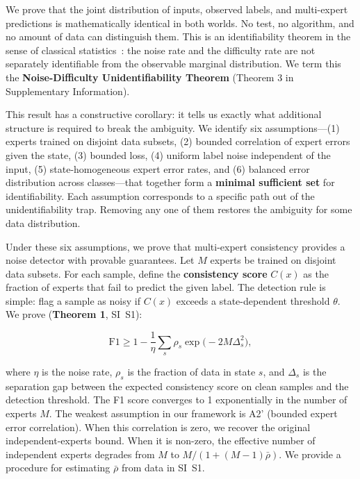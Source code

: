 \documentclass[12pt,a4paper]{article}
\begin{document}
We prove that the joint distribution of inputs, observed labels, and multi-expert predictions is mathematically identical in both worlds. No test, no algorithm, and no amount of data can distinguish them. This is an identifiability theorem in the sense of classical statistics~\cite{placeholder}: the noise rate and the difficulty rate are not separately identifiable from the observable marginal distribution. We term this the \textbf{Noise-Difficulty Unidentifiability Theorem} (Theorem 3 in Supplementary Information).

This result has a constructive corollary: it tells us exactly what additional structure is required to break the ambiguity. We identify six assumptions---(1) experts trained on disjoint data subsets, (2) bounded correlation of expert errors given the state, (3) bounded loss, (4) uniform label noise independent of the input, (5) state-homogeneous expert error rates, and (6) balanced error distribution across classes---that together form a \textbf{minimal sufficient set} for identifiability. Each assumption corresponds to a specific path out of the unidentifiability trap. Removing any one of them restores the ambiguity for some data distribution.

Under these six assumptions, we prove that multi-expert consistency provides a noise detector with provable guarantees. Let $M$ experts be trained on disjoint data subsets. For each sample, define the \textbf{consistency score} $C(x)$ as the fraction of experts that fail to predict the given label. The detection rule is simple: flag a sample as noisy if $C(x)$ exceeds a state-dependent threshold $\theta$. We prove (\textbf{Theorem 1}, SI~S1):

\begin{equation}
\mathrm{F1} \geq 1 - \frac{1}{\eta}\sum_{s} \rho_s \exp\bigl(-2M\Delta_s^2\bigr),
\end{equation}

where $\eta$ is the noise rate, $\rho_s$ is the fraction of data in state $s$, and $\Delta_s$ is the separation gap between the expected consistency score on clean samples and the detection threshold. The F1 score converges to 1 exponentially in the number of experts $M$. The weakest assumption in our framework is A2' (bounded expert error correlation). When this correlation is zero, we recover the original independent-experts bound. When it is non-zero, the effective number of independent experts degrades from $M$ to $M/(1+(M-1)\bar{\rho})$. We provide a procedure for estimating $\bar{\rho}$ from data in SI~S1.
\end{document}
